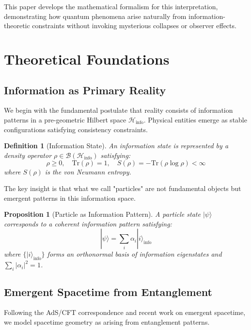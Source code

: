 \documentclass[12pt,a4paper]{article}
\newtheorem{proposition}[theorem]{Proposition}
\newtheorem{definition}[theorem]{Definition}
\begin{document}
This paper develops the mathematical formalism for this interpretation, demonstrating how quantum phenomena arise naturally from information-theoretic constraints without invoking mysterious collapses or observer effects.

\section{Theoretical Foundations}

\subsection{Information as Primary Reality}

We begin with the fundamental postulate that reality consists of information patterns in a pre-geometric Hilbert space $\mathcal{H}_{\text{info}}$. Physical entities emerge as stable configurations satisfying consistency constraints.

\begin{definition}[Information State]
An information state is represented by a density operator $\rho \in \mathcal{B}(\mathcal{H}_{\text{info}})$ satisfying:
\begin{equation}
\rho \geq 0, \quad \text{Tr}(\rho) = 1, \quad S(\rho) = -\text{Tr}(\rho \log \rho) < \infty
\end{equation}
where $S(\rho)$ is the von Neumann entropy.
\end{definition}

The key insight is that what we call "particles" are not fundamental objects but emergent patterns in this information space.

\begin{proposition}[Particle as Information Pattern]
A particle state $|\psi\rangle$ corresponds to a coherent information pattern satisfying:
\begin{equation}
|\psi\rangle = \sum_{i} \alpha_i |i\rangle_{\text{info}}
\end{equation}
where $\{|i\rangle_{\text{info}}\}$ forms an orthonormal basis of information eigenstates and $\sum_i |\alpha_i|^2 = 1$.
\end{proposition}

\subsection{Emergent Spacetime from Entanglement}

Following the AdS/CFT correspondence and recent work on emergent spacetime, we model spacetime geometry as arising from entanglement patterns.
\end{document}

